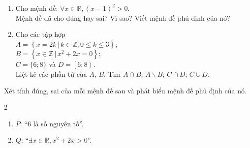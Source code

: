\begin{bt}%
	\begin{enumerate} 
		\item Cho mệnh đề: $\forall x \in \mathbb{R},(x-1)^2>0$. \\
		Mệnh đề đã cho đúng hay sai? Vì sao? Viết mệnh đề phủ định của nó?
		\item Cho các tập hợp \\
		$A=\left\{x=2 k \,|\, k \in \mathbb{Z}, 0 \leq k \leq 3\right\} $;\\
		$B=\left\{x \in \mathbb{Z} \,|\,  x^2+2x=0\right\}$; \\
		$C=\{6;8\}$ và $D=\left[6;8\right)$.\\
		Liệt kê các phần tử của $A$, $B$. Tìm $A \cap B$; $ A \backslash B$; $C \cap D$; $ C \cup D$.
	\end{enumerate}
	
\end{bt}

\begin{bt}%
	Xét tính đúng, sai của mỗi mệnh đề sau và phát biểu mệnh đề phủ định của nó.
	\begin{multicols}{2}
		\begin{enumerate}
			\item $P$: ``$6$ là số nguyên tố''.
			\item $Q$: ``$\exists x \in \mathbb{R}, x^2+2 x>0$''.
		\end{enumerate}
	\end{multicols}
\end{bt}

